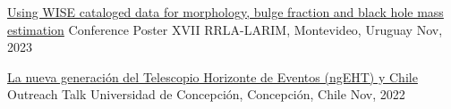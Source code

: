 
\begin{cvhonors}
    \cvhonor
	{\href{https://joacoh.github.io/talks/2023-11-29-talk}{Using WISE cataloged data for morphology, bulge fraction and black hole mass estimation}}
	{Conference Poster}
	{XVII RRLA-LARIM, Montevideo, Uruguay}
	{Nov, 2023}

    \cvhonor
	{\href{https://joacoh.github.io/talks/2022-11-04-talk}{La nueva generación del Telescopio Horizonte de Eventos (ngEHT) y Chile}}
	{Outreach Talk}
	{Universidad de Concepción, Concepción, Chile}
	{Nov, 2022}
 
\end{cvhonors}
